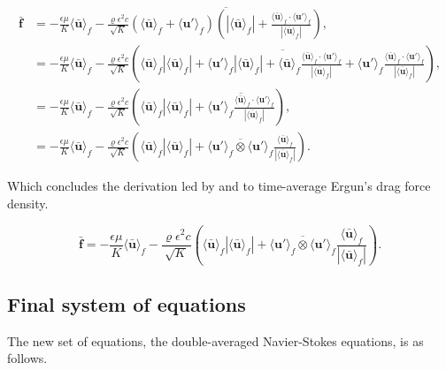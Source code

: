 \documentclass[a4paper,11pt]{article}
\begin{document}
\begin{align*}
\bm{\bar f} &= -\frac{\epsilon\mu}{K}\langle\bm{\bar u}\rangle_f - \frac{\varrho\epsilon^2c}{\sqrt{K}}\overline{\left(\langle\bm{\bar u}\rangle_f + \langle\bm u'\rangle_f\right)\left(\left|\langle\bm{\bar u}\rangle_f\right|+\frac{\langle\bm{\bar u}\rangle_f\cdot\langle\bm u'\rangle_f}{\left|\langle\bm{\bar u}\rangle_f\right|}\right)},\\
    &= -\frac{\epsilon\mu}{K}\langle\bm{\bar u}\rangle_f - \frac{\varrho\epsilon^2c}{\sqrt{K}}\left(\overline{\langle\bm{\bar u}\rangle_f\left|\langle\bm{\bar u}\rangle_f\right| + \langle\bm u'\rangle_f\left|\langle\bm{\bar u}\rangle_f\right| + \langle\bm{\bar u}\rangle_f\frac{\langle\bm{\bar u}\rangle_f\cdot\langle\bm u'\rangle_f}{\left|\langle\bm{\bar u}\rangle_f\right|} + \langle\bm u'\rangle_f\frac{\langle\bm{\bar u}\rangle_f\cdot\langle\bm u'\rangle_f}{\left|\langle\bm{\bar u}\rangle_f\right|}}\right),\\
    &= -\frac{\epsilon\mu}{K}\langle\bm{\bar u}\rangle_f - \frac{\varrho\epsilon^2c}{\sqrt{K}}\left(\langle\bm{\bar u}\rangle_f\left|\langle\bm{\bar u}\rangle_f\right| + \overline{\langle\bm u'\rangle_f\frac{\langle\bm{\bar u}\rangle_f\cdot\langle\bm u'\rangle_f}{\left|\langle\bm{\bar u}\rangle_f\right|}}\right),\\
    &= -\frac{\epsilon\mu}{K}\langle\bm{\bar u}\rangle_f - \frac{\varrho\epsilon^2c}{\sqrt{K}}\left(\langle\bm{\bar u}\rangle_f\left|\langle\bm{\bar u}\rangle_f\right| + \overline{\langle\bm u'\rangle_f\otimes\langle\bm u'\rangle_f}\frac{\langle\bm{\bar u}\rangle_f}{\left|\langle\bm{\bar u}\rangle_f\right|}\right).
\end{align*}

Which concludes the derivation led by \citet{G2000} and \citet{Kuwata2013} to time-average Ergun's drag force density.

$$\boxed{\bm{\bar f} = -\frac{\epsilon\mu}{K}\langle\bm{\bar u}\rangle_f - \frac{\varrho\epsilon^2c}{\sqrt{K}}\left(\langle\bm{\bar u}\rangle_f\left|\langle\bm{\bar u}\rangle_f\right| + \overline{\langle\bm u'\rangle_f\otimes\langle\bm u'\rangle_f}\frac{\langle\bm{\bar u}\rangle_f}{\left|\langle\bm{\bar u}\rangle_f\right|}\right).}$$

\subsection{Final system of equations}

The new set of equations, the double-averaged Navier-Stokes equations, is as follows.
\end{document}
